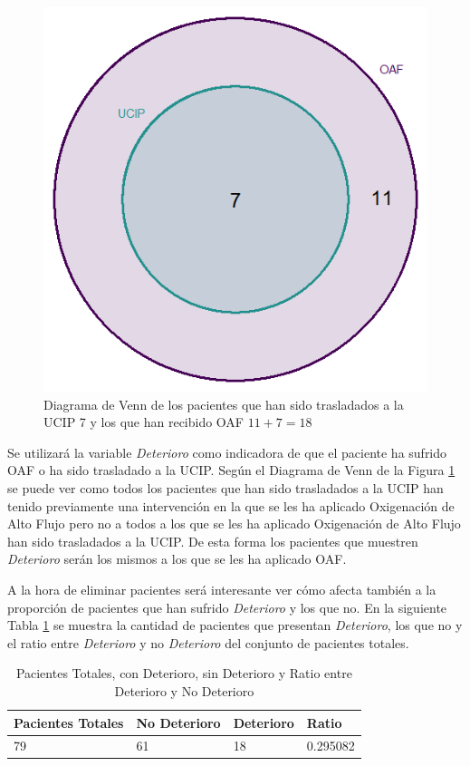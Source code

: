 \begin{figure}[H]
    \centering
    \includegraphics[scale = 1.50]{./img/venn-diagram-OAF-UCIP.png}
    \caption{Diagrama de Venn de los pacientes que han sido trasladados a la UCIP 7 y los que han recibido OAF $11 + 7 = 18$}
    \label{fig:venn-OAF-UCIP}
\end{figure}


Se utilizará la variable \textit{Deterioro} como indicadora de que el paciente ha sufrido OAF o ha sido trasladado a la UCIP. Según el Diagrama de Venn de la Figura \ref{fig:venn-OAF-UCIP} se puede ver como todos los pacientes que han sido trasladados a la UCIP han tenido previamente una intervención en la que se les ha aplicado Oxigenación de Alto Flujo pero no a todos a los que se les ha aplicado Oxigenación de Alto Flujo han sido trasladados a la UCIP. De esta forma los pacientes que muestren \textit{Deterioro} serán los mismos a los que se les ha aplicado OAF.


A la hora de eliminar pacientes será interesante ver cómo afecta también a la proporción de pacientes que han sufrido \textit{Deterioro} y los que no. En la siguiente Tabla \ref{tabla:ratio-deterioro} se muestra la cantidad de pacientes que presentan \textit{Deterioro}, los que no y el ratio entre \textit{Deterioro} y no \textit{Deterioro} del conjunto de pacientes totales.

\begin{table}[H]
    \centering
    \begin{tabular}{|m{2cm}|m{2.25cm}|m{2cm}|m{2cm}|}
    \hline
        Pacientes Totales & No Deterioro & Deterioro & Ratio \\ \hline
        79 & 61 & 18 & 0.295082 \\ \hline
    \end{tabular}
    \caption{Pacientes Totales, con Deterioro, sin Deterioro y Ratio entre Deterioro y No Deterioro}
        \label{tabla:ratio-deterioro}
\end{table}

